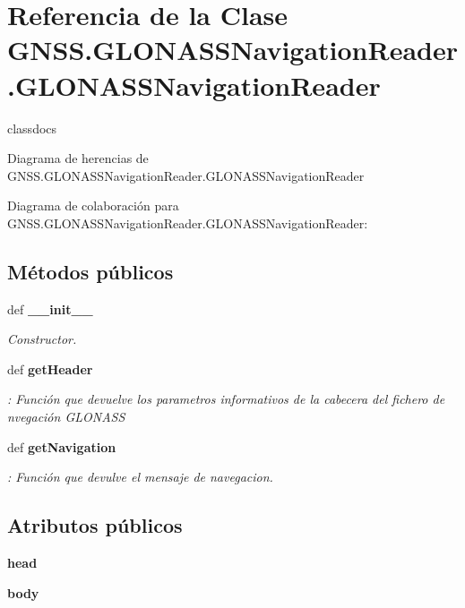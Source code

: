 \section{Referencia de la Clase G\-N\-S\-S.\-G\-L\-O\-N\-A\-S\-S\-Navigation\-Reader.\-G\-L\-O\-N\-A\-S\-S\-Navigation\-Reader}
\label{classGNSS_1_1GLONASSNavigationReader_1_1GLONASSNavigationReader}


classdocs  




Diagrama de herencias de G\-N\-S\-S.\-G\-L\-O\-N\-A\-S\-S\-Navigation\-Reader.\-G\-L\-O\-N\-A\-S\-S\-Navigation\-Reader


Diagrama de colaboración para G\-N\-S\-S.\-G\-L\-O\-N\-A\-S\-S\-Navigation\-Reader.\-G\-L\-O\-N\-A\-S\-S\-Navigation\-Reader\-:
\subsection*{Métodos públicos}
\begin{DoxyCompactItemize}
\item 
def {\bf \-\_\-\-\_\-init\-\_\-\-\_\-}
\begin{DoxyCompactList}\small\item\em Constructor. \end{DoxyCompactList}\item 
def {\bf get\-Header}
\begin{DoxyCompactList}\small\item\em \-: Función que devuelve los parametros informativos de la cabecera del fichero de nvegación G\-L\-O\-N\-A\-S\-S \end{DoxyCompactList}\item 
def {\bf get\-Navigation}
\begin{DoxyCompactList}\small\item\em \-: Función que devulve el mensaje de navegacion. \end{DoxyCompactList}\end{DoxyCompactItemize}
\subsection*{Atributos públicos}
\begin{DoxyCompactItemize}
\item 
{\bf head}
\item 
{\bf body}
\end{DoxyCompactItemize}


